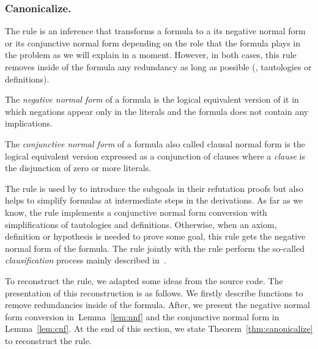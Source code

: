 \documentclass[../../main.tex]{subfiles}
\begin{document}
\subsubsection{Canonicalize.}
\label{sssec:canonicalize}

The \canonicalize rule is an inference that transforms a formula to a
its negative normal form or its conjunctive normal form depending on
the role that the formula plays in the problem as we will explain in
a moment. However, in both cases, this rule removes inside of the
formula  any redundancy as long as possible (\ie, tautologies or
definitions).

\begin{mydefinition}

The \emph{negative normal form} of a formula is the logical equivalent version
of it in which negations appear only in the literals and the formula does not
contain any implications.

\end{mydefinition}

\begin{mydefinition}

The \emph{conjunctive normal form} of a formula also called clausal
normal form is the logical equivalent version expressed as a
conjunction of clauses where a \emph{clause} is the disjunction of
zero or more literals.

\end{mydefinition}

The \canonicalize rule is used by \Metis to introduce the subgoals in
their refutation proofs but also helps to simplify formulas at
intermediate steps in the derivations. As far as we know, the
\canonicalize rule implements a conjunctive normal form conversion
with simplifications of tautologies and definitions. Otherwise, when
an axiom, definition or hypothesis is needed to prove some goal, this
rule gets the negative normal form of the formula. The \canonicalize
rule jointly with the \clausify rule perform the so-called
\emph{clausification} process mainly described
in~\cite{Sutcliffe1996}.

To reconstruct the \canonicalize rule, we adapted some ideas from the
\Metis source code. The presentation of this reconstruction is as
follows. We firstly describe functions to remove redundancies inside
of the formula. After, we present the negative normal form conversion
in~Lemma~\ref{lem:nnf} and the conjunctive normal form in
Lemma~\ref{lem:cnf}. At the end of this section, we state
Theorem~\ref{thm:canonicalize} to reconstruct the \canonicalize rule.
\end{document}
